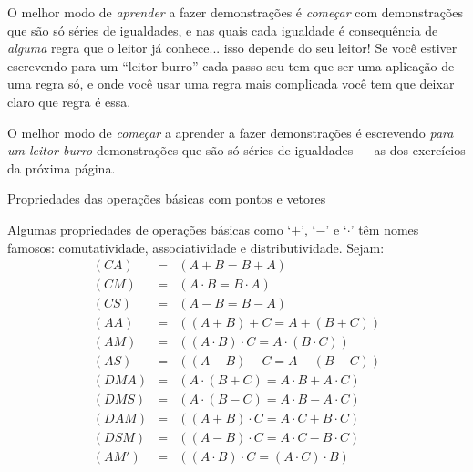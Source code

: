 \documentclass[oneside]{book}
\begin{document}
O melhor modo de {\sl aprender} a fazer demonstrações é {\sl começar}
com demonstrações que são só séries de igualdades, e nas quais cada
igualdade é consequência de {\sl alguma} regra que o leitor já
conhece... isso depende do seu leitor! Se você estiver escrevendo para
um ``leitor burro'' cada passo seu tem que ser uma aplicação de uma
regra só, e onde você usar uma regra mais complicada você tem que
deixar claro que regra é essa.

O melhor modo de {\sl começar} a aprender a fazer demonstrações é
escrevendo {\sl para um leitor burro} demonstrações que são só séries
de igualdades --- as dos exercícios da próxima página.


\newpage

%
 {Propriedades das operações básicas com pontos e vetores}

\def\eqo#1{\overset{#1}{=}}
\def\eqq{\eqo{?}}
\def\eqN{\eqo{\text{NÃO!}}}
\def\pab{(a,b)}
\def\pcd{(c,d)}
\def\pef{(e,f)}
\def\vab{\VEC{a,b}}
\def\vcd{\VEC{c,d}}
\def\vef{\VEC{e,f}}

Algumas propriedades de operações básicas como `$+$', `$-$' e `$·$'
têm nomes famosos: comutatividade, associatividade e distributividade.
Sejam:
%
$$\begin{array}{rcl}
  (CA) &=& (A+B = B+A) \\
  (CM) &=& (A·B = B·A) \\
  (CS) &=& (A-B = B-A) \\
  (AA) &=& ((A+B)+C = A+(B+C)) \\
  (AM) &=& ((A·B)·C = A·(B·C)) \\
  (AS) &=& ((A-B)-C = A-(B-C)) \\
  (DMA) &=& (A·(B+C) = A·B+A·C) \\
  (DMS) &=& (A·(B-C) = A·B-A·C) \\
  (DAM) &=& ((A+B)·C = A·C+B·C) \\
  (DSM) &=& ((A-B)·C = A·C-B·C) \\
  (AM') &=& ((A·B)·C = (A·C)·B) \\
  \end{array}
$$
\end{document}
